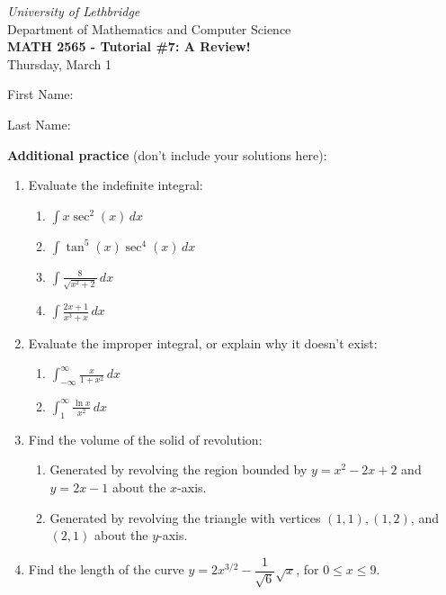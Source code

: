 \documentclass[12pt]{article}
\newcommand{\skipline}{\vspace{12pt}}
\newcommand{\di}{\displaystyle}
\begin{document}
\author{Instructor: Sean Fitzpatrick}
\thispagestyle{empty}
\begin{center}
\emph{University of Lethbridge}\\
Department of Mathematics and Computer Science\\
{\bf MATH 2565 - Tutorial \#7: A Review!}\\
Thursday, March 1
\end{center}
\skipline \skipline \skipline \noindent \skipline

\skipline
First Name:\underline{\hspace{348pt}}\\
\skipline

\vspace{1cm}

Last Name:\underline{\hspace{351pt}}



\vspace{2cm}





\textbf{Additional practice} (don't include your solutions here):
\begin{enumerate}
\item Evaluate the indefinite integral:
\begin{multicols}{2}
\begin{enumerate}
 \item $\di \int x\sec^2(x)\,dx$
 \item $\di \int \tan^5(x)\sec^4(x)\,dx$
 \item $\di \int \frac{8}{\sqrt{x^2+2}}\,dx$
 \item $\di \int \frac{2x+1}{x^3+x}\,dx$
\end{enumerate}
\end{multicols}
\item Evaluate the improper integral, or explain why it doesn't exist:
\begin{multicols}{2}
\begin{enumerate}
 \item $\di \int_{-\infty}^\infty \frac{x}{1+x^2}\,dx$
 \item $\di \int_1^\infty\frac{\ln x}{x^2}\,dx$
\end{enumerate}
\end{multicols}
\item Find the volume of the solid of revolution:
\begin{enumerate}
\item Generated by revolving the region bounded by $y=x^2-2x+2$ and $y=2x-1$ about the $x$-axis.
 \item Generated by revolving the triangle with vertices $(1,1), (1,2)$, and $(2,1)$ about the $y$-axis.
\end{enumerate}
\item Find the length of the curve $y=2x^{3/2}-\dfrac{1}{\sqrt{6}}\sqrt{x}$, for $0\leq x\leq 9$.

\end{enumerate}
\end{document}
